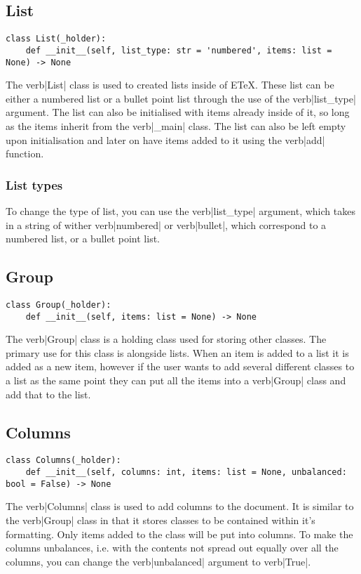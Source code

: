 \documentclass{article}
\begin{document}
\subsection{List}\label{subsec:list}
\begin{verbatim}
class List(_holder):
	def __init__(self, list_type: str = 'numbered', items: list = None) -> None
\end{verbatim}
The verb|List| class is used to created lists inside of ETeX. These list can be either a numbered list or a bullet point list through the use of the verb|list_type| argument. The list can also be initialised with items already inside of it, so long as the items inherit from the verb|_main| class. The list can also be left empty upon initialisation and later on have items added to it using the verb|add| function.
\subsubsection{List types}\label{subsubsec:list_types}
To change the type of list, you can use the verb|list_type| argument, which takes in a string of wither verb|numbered| or verb|bullet|, which correspond to a numbered list, or a bullet point list.
\subsection{Group}\label{subsec:group}
\begin{verbatim}
class Group(_holder):
	def __init__(self, items: list = None) -> None
\end{verbatim}
The verb|Group| class is a holding class used for storing other classes. The primary use for this class is alongside lists. When an item is added to a list it is added as a new item, however if the user wants to add several different classes to a list as the same point they can put all the items into a verb|Group| class and add that to the list.
\subsection{Columns}\label{subsec:columns}
\begin{verbatim}
class Columns(_holder):
	def __init__(self, columns: int, items: list = None, unbalanced: bool = False) -> None
\end{verbatim}
The verb|Columns| class is used to add columns to the document. It is similar to the verb|Group| class in that it stores classes to be contained within it's formatting. Only items added to the class will be put into columns. To make the columns unbalances, i.e. with the contents not spread out equally over all the columns, you can change the verb|unbalanced| argument to verb|True|.
\end{document}
